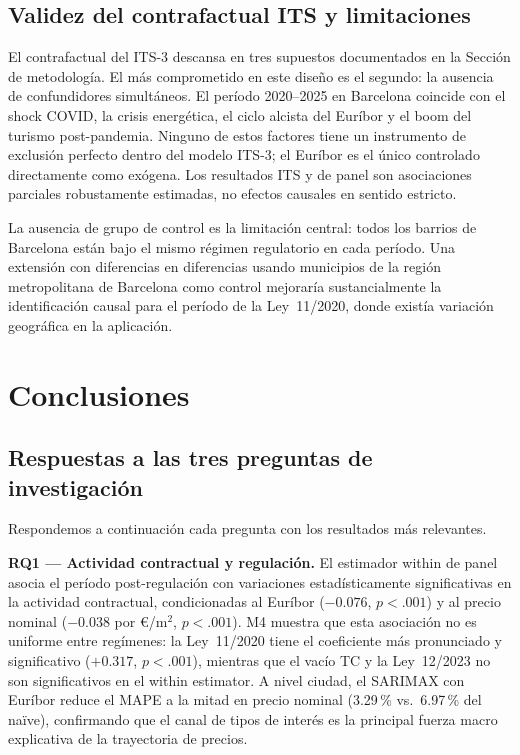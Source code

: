 \documentclass[10pt,a4paper,twocolumn]{article}
\begin{document}
\subsection{Validez del contrafactual ITS y limitaciones}

El contrafactual del ITS-3 descansa en tres supuestos documentados en la Sección
de metodología. El más comprometido en este diseño es el segundo: la ausencia de
confundidores simultáneos. El período 2020--2025 en Barcelona coincide con el
shock COVID, la crisis energética, el ciclo alcista del Euríbor y el boom del
turismo post-pandemia. Ninguno de estos factores tiene un instrumento de exclusión
perfecto dentro del modelo ITS-3; el Euríbor es el único controlado directamente
como exógena. Los resultados ITS y de panel son asociaciones parciales robustamente
estimadas, no efectos causales en sentido estricto.

La ausencia de grupo de control es la limitación central: todos los barrios de
Barcelona están bajo el mismo régimen regulatorio en cada período. Una extensión
con diferencias en diferencias usando municipios de la región metropolitana de
Barcelona como control mejoraría sustancialmente la identificación causal para
el período de la Ley~11/2020, donde existía variación geográfica en la aplicación.

\balance 

\section{Conclusiones}
\label{sec:conclusiones}

\subsection{Respuestas a las tres preguntas de investigación}

Respondemos a continuación cada pregunta con los resultados más relevantes.

\textbf{RQ1 — Actividad contractual y regulación.} El estimador within de panel
asocia el período post-regulación con variaciones estadísticamente significativas
en la actividad contractual, condicionadas al Euríbor ($-0.076$, $p{<}.001$) y
al precio nominal ($-0.038$ por \euro/m$^2$, $p{<}.001$). M4 muestra que esta
asociación no es uniforme entre regímenes: la Ley~11/2020 tiene el coeficiente
más pronunciado y significativo ($+0.317$, $p{<}.001$), mientras que el vacío TC
y la Ley~12/2023 no son significativos en el within estimator. A nivel ciudad,
el SARIMAX con Euríbor reduce el MAPE a la mitad en precio nominal (3.29\,\%
vs.\ 6.97\,\% del naïve), confirmando que el canal de tipos de interés es la
principal fuerza macro explicativa de la trayectoria de precios.
\end{document}

